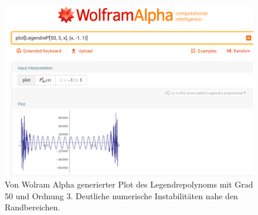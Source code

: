 \begin{figure}[!h]
\centering
\includegraphics[width=0.9\linewidth]{papers/legendre/plots/wolframalpha}
\caption{Von Wolram Alpha \cite{legendre:wolfram-alpha} generierter Plot des Legendrepolynoms mit Grad 50 und Ordnung 3. Deutliche numerische Instabilitäten nahe den Randbereichen.}
\label{legendre:fig:wolframalpha}
\end{figure}







